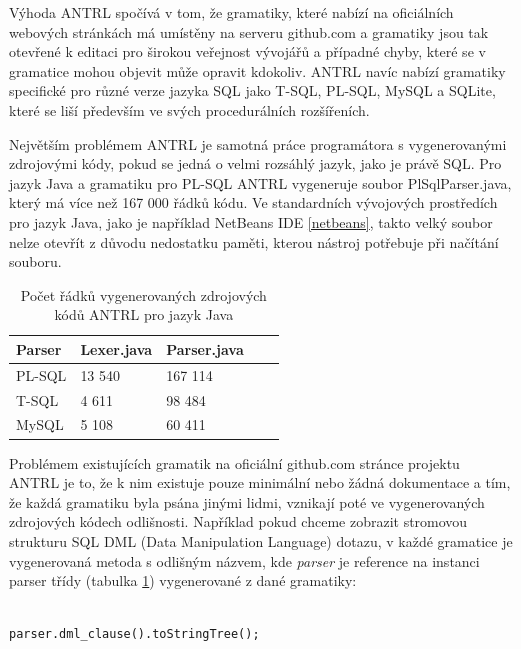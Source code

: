 \documentclass[czech,bachelor,public,dept460,male,cpdeclaration,twoside]{diploma}
\begin{document}
Výhoda ANTRL spočívá v tom, že gramatiky, které nabízí na oficiálních webových stránkách má umístěny na serveru github.com a gramatiky jsou tak otevřené k editaci pro širokou veřejnost vývojářů a případné chyby, které se v gramatice mohou objevit může opravit kdokoliv. ANTRL navíc nabízí gramatiky specifické pro různé verze jazyka SQL jako T-SQL, PL-SQL, MySQL a SQLite, které se liší především ve svých procedurálních rozšířeních. \cite{antrlg}



Největším problémem ANTRL je samotná práce programátora s vygenerovanými zdrojovými kódy, pokud se jedná o velmi rozsáhlý jazyk, jako je právě SQL. Pro jazyk Java a gramatiku pro PL-SQL ANTRL vygeneruje soubor PlSqlParser.java, který má více než 167 000 řádků kódu. Ve standardních vývojových prostředích pro jazyk Java, jako je například NetBeans IDE \ref{netbeans}, takto velký soubor nelze otevřít z důvodu nedostatku paměti, kterou nástroj potřebuje při načítání souboru.

\begin{table}[!htbp]
	\centering
	\caption{Počet řádků vygenerovaných zdrojových kódů ANTRL pro jazyk Java}
	\label{tab:parsers}
	\begin{tabular}{lllll}
		\toprule
		Parser & Lexer.java & Parser.java\\
		\midrule
		PL-SQL & 13 540 & 167 114 \\
        T-SQL & 4 611 & 98 484 \\
        MySQL & 5 108 & 60 411 \\
		\midrule
	\end{tabular}
\end{table}


Problémem existujících gramatik na oficiální github.com stránce projektu ANTRL je to, že k nim existuje pouze minimální nebo žádná dokumentace a tím, že každá gramatiku byla psána jinými lidmi, vznikají poté ve vygenerovaných zdrojových kódech odlišnosti. Například pokud chceme zobrazit stromovou strukturu SQL DML (Data Manipulation Language) dotazu, v každé gramatice je vygenerovaná metoda s odlišným názvem, kde \textit{parser} je reference na instanci parser třídy (tabulka \ref{tab:parsers}) vygenerované z dané gramatiky:\newline

\begin{lstlisting}[caption=T-SQL Parser]

parser.dml_clause().toStringTree();
\end{lstlisting}
\end{document}
